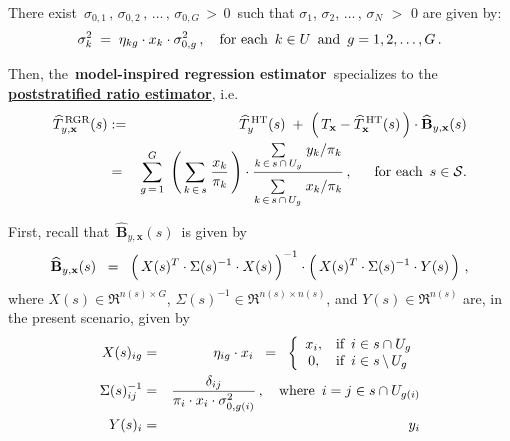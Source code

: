 \begin{proposition}
\begin{enumerate}
	There exist \,$\sigma_{0,1} \,,\, \sigma_{0,2} \,,\, \ldots \,,\, \sigma_{0,G} \,>\, 0$\,
	such that
	$\sigma_{1}$, $\sigma_{2}$, $\ldots$\,, $\sigma_{N}$ $>$ $0$ are given by:
	\begin{equation*}
	\sigma_{k}^{2} \; = \; \eta_{kg} \cdot x_{k} \cdot \sigma_{0,g}^{2}\,,
	\quad\textnormal{for each \,$k \in U$\, and \,$g = 1,2,\ldots,G$}\,.
	\end{equation*}
\end{enumerate}
\renewcommand{\theenumi}{\roman{enumi}}
\renewcommand{\labelenumi}{\textnormal{(\theenumi)}$\;\;$}
Then, the \,\textbf{model-inspired regression estimator}\,
specializes to the \,\underline{\textbf{{\color{red}poststratified ratio} estimator}}, i.e.
\begin{eqnarray*}
\widehat{T}^{\,\textnormal{RGR}}_{y,\mathbf{x}}(s)
& := &
	\widehat{T}^{\,\textnormal{HT}}_{y}(s)
	\; + \;
	\left(\,T_{\mathbf{x}} - \widehat{T}^{\,\textnormal{HT}}_{\mathbf{x}}(s) \,\right)
	\cdot
	\widehat{\mathbf{B}}_{y,\mathbf{x}}(s)
\\
& = &
	\overset{G}{\underset{g\,=\,1}{\sum}}\;
	\left(\, \underset{k\,\in\,s}{\overset{{\color{white}.}}{\sum}}\; \dfrac{x_{k}}{\pi_{k}} \,\right)
	\cdot
	\dfrac{
		\underset{k\,\in\,s\,\cap\,U_{g}}{\sum}\;y_{k}/\pi_{k}
		}{
		\underset{k\,\in\,s\,\cap\,U_{g}}{\overset{{\color{white}.}}{\sum}}\;x_{k}/\pi_{k}
		}
	\,,\;\;\quad\textnormal{for each \,$s \in \mathcal{S}$}.
\end{eqnarray*}
\end{proposition}
\proof
First, recall that \,$\widehat{\mathbf{B}}_{y,\mathbf{x}}(s)$\, is given by
\begin{equation*}
\widehat{\mathbf{B}}_{y,\mathbf{x}}(s)
\;\; = \;\;
	\left(\,X(s)^{T} \overset{{\color{white}!}}{\cdot} \Sigma(s)^{-1} \cdot X(s)\,\right)^{-1}
	\cdot
	\left(\,X(s)^{T} \overset{{\color{white}!}}{\cdot} \Sigma(s)^{-1} \cdot Y(s) \,\right)\,,
\end{equation*}
where $X(s) \in \Re^{n(s) \times G}$, $\Sigma(s)^{-1} \in \Re^{n(s) \times n(s)}$, and $Y(s) \in \Re^{n(s)}$
are, in the present scenario, given by
\begin{eqnarray*}
X(s)_{ig}
& = &
	\eta_{ig} \cdot x_{i}
\;\; = \;\;
	\left\{\begin{array}{cl}
		x_{i}, &  \textnormal{if \,$i \in s \cap U_{g}$}
		\\
		0, & \textnormal{if \,$i \in s\,\backslash\,U_{g}$}
	\end{array}\right.
\\
\Sigma(s)^{-1}_{ij}
& = &
	\dfrac{\delta_{ij}}{\pi_{i}\cdot x_{i} \cdot\sigma^{2}_{0,g(i)}}\,,
	\quad
	\textnormal{where \,$i = j \in s \cap U_{g(i)}$}
\\
Y(s)_{i}
& = &
	y_{i}
\end{eqnarray*}
